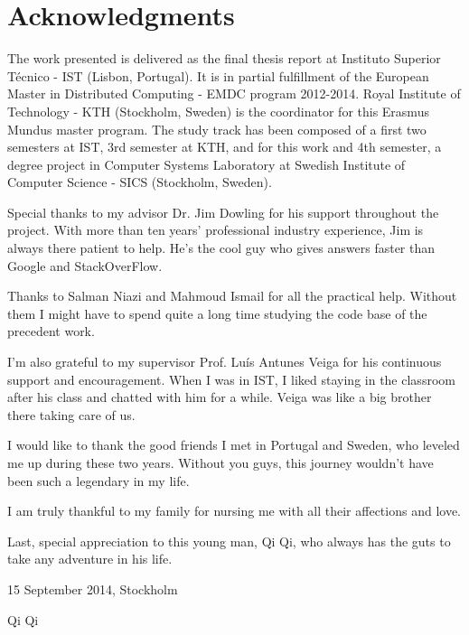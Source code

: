 \chapter*{Acknowledgments}
\thispagestyle{empty}


The work presented is delivered as the final thesis report at Instituto Superior Técnico - IST (Lisbon, Portugal). It is in partial fulfillment of the European Master in Distributed Computing - EMDC program 2012-2014. Royal Institute of Technology - KTH (Stockholm, Sweden) is the coordinator for this Erasmus Mundus master program. The study track has been composed of a first two semesters at IST, 3rd semester at KTH, and for this work and 4th semester, a degree project in Computer Systems Laboratory at Swedish Institute of Computer Science - SICS (Stockholm, Sweden).

\noindent Special thanks to my advisor Dr. Jim Dowling for his support throughout the project. With more than ten years' professional industry experience, Jim is always there patient to help. He's the cool guy who gives answers faster than Google and StackOverFlow.

\noindent Thanks to Salman Niazi and Mahmoud Ismail for all the practical help. Without them I might have to spend quite a long time studying the code base of the precedent work.

\noindent I'm also grateful to my supervisor Prof. Luís Antunes Veiga for his continuous support and encouragement. When I was in IST, I liked staying in the classroom after his class and chatted with him for a while. Veiga was like a big brother there taking care of us.

\noindent I would like to thank the good friends I met in Portugal and Sweden, who leveled me up during these two years. Without you guys, this journey wouldn't have been such a legendary in my life.

\noindent I am truly thankful to my family for nursing me with all their affections and love.

\noindent Last, special appreciation to this young man, Qi Qi, who always has the guts to take any adventure in his life.

\vfill
\begin{flushright}
  \begin{minipage}{8cm}
    \begin{center}
      15 September 2014, Stockholm

      Qi Qi
    \end{center}
  \end{minipage}
\end{flushright}

